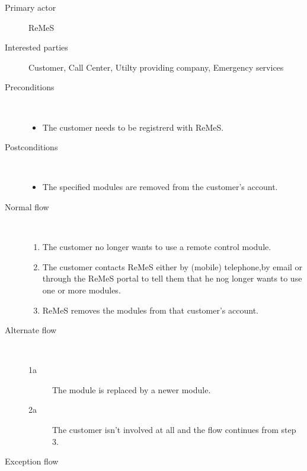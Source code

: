 \begin{description}
	\item[Primary actor] ReMeS
	\item[Interested parties] Customer, Call Center, Utilty providing company,
	Emergency services
	\item[Preconditions] \ 
	\begin{itemize}
		\item The customer needs to be registrerd with ReMeS.
	\end{itemize}
	\item[Postconditions] \ 
	\begin{itemize}
		\item The specified modules are removed from the customer's account.
	\end{itemize}
	\item[Normal flow] \ 
	\begin{enumerate}
	  	\item The customer no longer wants to use a remote control module.
	  	\item The customer contacts ReMeS either by (mobile) telephone,by email or
	  	through the ReMeS portal to tell them that he nog longer wants to use one
	  	or more modules.
	  	\item ReMeS removes the modules from that customer's account. %
	\end{enumerate}
	\item[Alternate flow] \ 
	\begin{description}
		\item[1a] The module is replaced by a newer module.
		\item[2a] The customer isn't involved at all and the flow continues from step
		3.
	\end{description}
	\item[Exception flow] \ 
	\begin{description}
		\item
	\end{description}
\end{description}